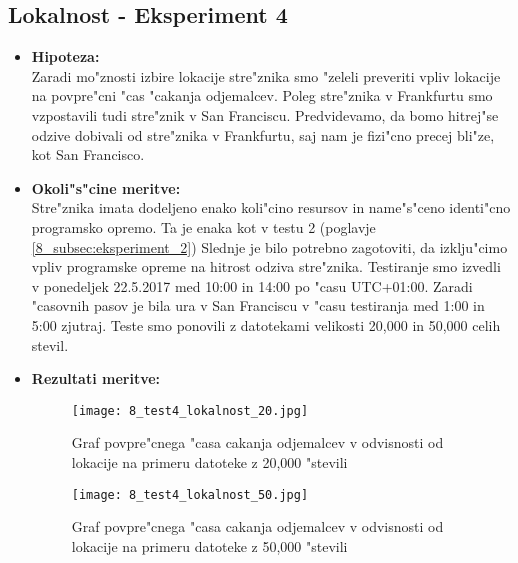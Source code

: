 \newpage
\subsection{Lokalnost - Eksperiment 4}
\label{8_subsec:eksperiment_4}
\begin{itemize}
	\item \textbf{Hipoteza: }  \\
		Zaradi mo"znosti izbire lokacije stre"znika smo "zeleli preveriti vpliv lokacije na povpre"cni "cas "cakanja odjemalcev. Poleg stre"znika v Frankfurtu smo vzpostavili tudi stre"znik v San Franciscu. Predvidevamo, da bomo hitrej"se odzive dobivali od stre"znika v Frankfurtu, saj nam je fizi"cno precej bli"ze, kot San Francisco.
	\item \textbf{Okoli"s"cine meritve: } \\
		Stre"znika imata dodeljeno enako koli"cino resursov in name"s"ceno identi"cno programsko opremo. Ta je enaka kot v testu 2 (poglavje \ref{8_subsec:eksperiment_2}) Slednje je bilo potrebno zagotoviti, da izklju"cimo vpliv programske opreme na hitrost odziva stre"znika. Testiranje smo izvedli v ponedeljek 22.5.2017 med 10:00 in 14:00 po "casu UTC+01:00. Zaradi "casovnih pasov je bila ura v San Franciscu v "casu testiranja med 1:00 in 5:00 zjutraj. Teste smo ponovili z datotekami velikosti 20,000 in 50,000 celih stevil.

 	\item \textbf{Rezultati meritve: }  \\
		\begin{figure}[h]
  		\centering
  		  \texttt{[image: 8\_test4\_lokalnost\_20.jpg]}
  		\caption{Graf povpre"cnega "casa cakanja odjemalcev v odvisnosti od lokacije na primeru datoteke z 20,000 "stevili}
  		\label{8_graf_lokalnost_20}
		\end{figure}

		\begin{figure}[h]
  		\centering
  		  \texttt{[image: 8\_test4\_lokalnost\_50.jpg]}
  		\caption{Graf povpre"cnega "casa cakanja odjemalcev v odvisnosti od lokacije na primeru datoteke z 50,000 "stevili}
  		\label{8_graf_lokalnost_50}
		\end{figure}


\end{itemize}
